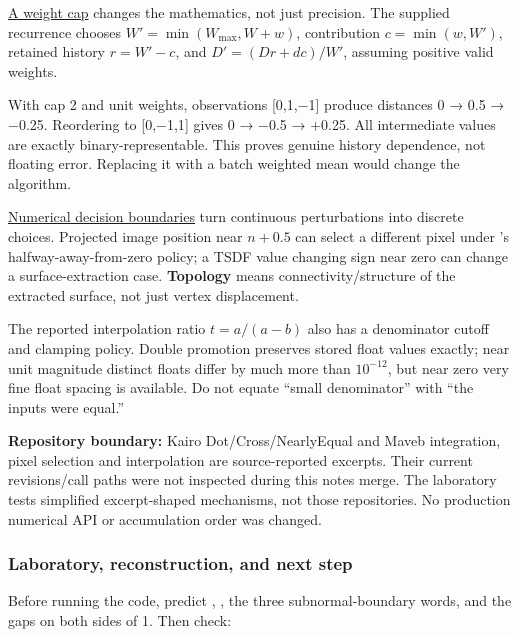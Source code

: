 \hyperref[appendix-1e45d0613db3]{A weight cap} changes the mathematics, not just precision. The supplied recurrence chooses \(W'=\min(W_{\max},W+w)\), contribution \(c=\min(w,W')\), retained history \(r=W'-c\), and \(D'=(Dr+dc)/W'\), assuming positive valid weights.

With cap 2 and unit weights, observations {[}0,1,−1{]} produce distances 0 → 0.5 → −0.25. Reordering to {[}0,−1,1{]} gives 0 → −0.5 → +0.25. All intermediate values are exactly binary-representable. This proves genuine history dependence, not floating error. Replacing it with a batch weighted mean would change the algorithm.

\hyperref[appendix-c80db39080be]{Numerical decision boundaries} turn continuous perturbations into discrete choices. Projected image position near \(n+0.5\) can select a different pixel under 's halfway-away-from-zero policy; a TSDF value changing sign near zero can change a surface-extraction case. \textbf{Topology} means connectivity/structure of the extracted surface, not just vertex displacement.

The reported interpolation ratio \(t=a/(a-b)\) also has a denominator cutoff and clamping policy. Double promotion preserves stored float values exactly; near unit magnitude distinct floats differ by much more than \(10^{-12}\), but near zero very fine float spacing is available. Do not equate ``small denominator'' with ``the inputs were equal.''

\textbf{Repository boundary:} Kairo Dot/Cross/NearlyEqual and Maveb integration, pixel selection and interpolation are source-reported excerpts. Their current revisions/call paths were not inspected during this notes merge. The laboratory tests simplified excerpt-shaped mechanisms, not those repositories. No production numerical API or accumulation order was changed.

\subsubsection{Laboratory, reconstruction, and next step}\label{01-foundations-i-ch001-laboratory-reconstruction-and-next-step}

\hypertarget{01-foundations-i-ch001-laboratory-reconstruction-and-next-step}{}

Before running the code, predict , , the three subnormal-boundary words, and the gaps on both sides of 1. Then check:

